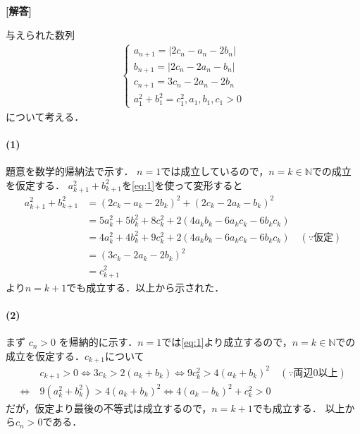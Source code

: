 \documentclass[../../main.tex]{subfiles}
\begin{document}
\begin{oframed}
  
\end{oframed}

{\bf [解答]}

与えられた数列
\begin{align}
  \begin{cases}
    a_{n+1}=|2c_n-a_n-2b_n| \\
    b_{n+1}=|2c_n-2a_n-b_n| \\
    c_{n+1}=3c_n-2a_n-2b_n \\
    a_1^2+b_1^2 = c_1^2, a_1,b_1,c_1>0
  \end{cases} \label{eq:1}
\end{align}
について考える．

\paragraph{(1)}

題意を数学的帰納法で示す．
$n=1$では成立しているので，$n=k \in \mathbb{N}$での成立を仮定する．
$a_{k+1}^2 + b_{k+1}^2$を\cref{eq:1}を使って変形すると
\begin{align}
  a_{k+1}^2 + b_{k+1}^2
  &= (2c_k-a_k-2b_k)^2 + (2c_k-2a_k-b_k)^2 \\
  &= 5a_k^2+5b_k^2+8c_k^2 + 2(4a_kb_k - 6a_kc_k - 6b_kc_k) \\
  &= 4a_k^2+4b_k^2+9c_k^2 + 2(4a_kb_k - 6a_kc_k - 6b_kc_k) \quad (\because\text{仮定})\\
  &= (3c_k-2a_k-2b_k)^2 \\
  &= c_{k+1}^2
\end{align}
より$n=k+1$でも成立する．以上から示された．

\paragraph{(2)}

まず $c_n > 0$ を帰納的に示す．$n=1$では\cref{eq:1}より成立するので，$n=k \in \mathbb{N}$での成立を仮定する．$c_{k+1}$について
\begin{align}
  & c_{k+1} > 0
  \Leftrightarrow
  3c_k > 2(a_k+b_k)
  \Leftrightarrow
  9c_k^2 > 4(a_k+b_k)^2 \quad (\because \text{両辺0以上}) \\
  \Leftrightarrow\
  & 9(a_k^2+b_k^2) > 4(a_k+b_k)^2
  \Leftrightarrow
  4(a_k-b_k)^2 + c_k^2 > 0
\end{align}
だが，仮定より最後の不等式は成立するので，$n=k+1$でも成立する．
以上から$c_n > 0$である．
\end{document}
